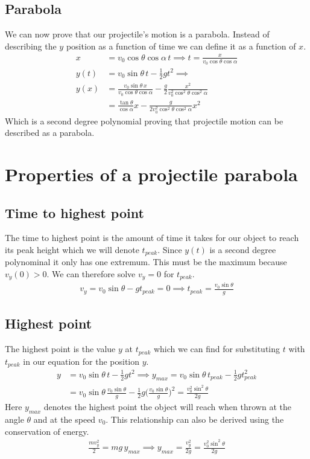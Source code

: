 \documentclass[%
aip,
jmp,
amsmath,amssymb,
reprint,%
]{revtex4-1}
\begin{document}
	\subsection{Parabola}
	We can now prove that our projectile's motion is a parabola. Instead of describing the $y$ position as a function of time we can define it as a function of $x$.
	\begin{align}\nonumber
		x &= v_0 \cos\theta\cos\alpha\,t\implies t = \frac{x}{v_0 \cos\theta\cos\alpha}\\\nonumber
		y(t) &= v_0 \sin\theta\,t - \frac12gt^2 \implies\\\nonumber
		y(x) &= \frac{v_0 \sin\theta\,x}{v_0 \cos\theta\cos\alpha}-\frac{g}{2}\frac{x^2}{v_{0}^2\cos^2\theta\cos^2\alpha}\\\label{eq:yFromX}
		&= \frac{\tan\theta}{\cos\alpha}x - \frac{g}{2v_{0}^2\cos^2\theta\cos^2\alpha} x^2
	\end{align}
	Which is a second degree polynomial proving that projectile motion can be described as a parabola.
	\section{Properties of a projectile parabola}\label{seq:properties}
	\subsection{Time to highest point}
	The time to highest point is the amount of time it takes for our object to reach its peak height which we will denote $t_{peak}$. Since $y(t)$ is a second degree polynominal it only has one extremum. This must be the maximum because $v_y(0) > 0$. We can therefore solve $v_y = 0$ for $t_{peak}$.
	\begin{align}\nonumber
		v_y = v_0\sin\theta - gt_{peak} = 0 \implies t_{peak} = \frac{v_0\sin\theta}{g}
	\end{align}
	\subsection{Highest point}
	The highest point is the value $y$ at $t_{peak}$ which we can find for substituting $t$ with $t_{peak}$ in our equation for the position $y$.
	\begin{align}\nonumber
		y&=v_0 \sin\theta\,t - \frac12gt^2 \implies y_{max} = v_0 \sin\theta\,t_{peak} - \frac12gt_{peak}^2\\\nonumber
		&= v_0 \sin\theta\,\frac{v_0\sin\theta}{g} - \frac12g\Big({\frac{v_0\sin\theta}{g}}\Big)^2    = \frac{v_{0}^2\sin^2\theta}{2g}\nonumber
	\end{align}
	Here $y_{max}$ denotes the highest point the object will reach when thrown at the angle $\theta$ and at the speed $v_0$. This relationship can also be derived using the conservation of energy.
	\begin{align}\nonumber
		\frac{mv_{y}^2}{2} = mg\,y_{max} \implies y_{max} = \frac{v_{y}^2}{2g} = \frac{v_{0}^2\sin^2\theta}{2g}
	\end{align}
\end{document}
